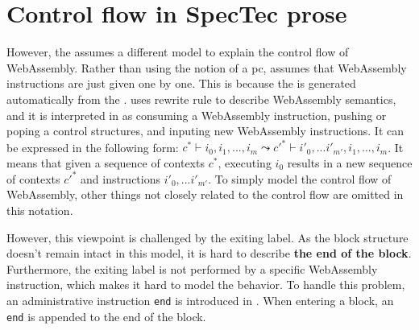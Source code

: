 \section{Control flow in SpecTec prose}

However, the \spectecp{} assumes a different model to explain the control flow
of WebAssembly.
Rather than using the notion of a pc, \spectecp{} assumes that WebAssembly
instructions are just given one by one.
This is because the \spectecp{} is generated automatically from the
.
 uses rewrite rule to describe WebAssembly semantics, and it
is interpreted in \spectecp{} as consuming a WebAssembly instruction, pushing
or poping a control structures, and inputing new WebAssembly instructions.
It can be expressed in the following form:
$c^* \vdash i_0, i_1, ..., i_m \leadsto c'^* \vdash i'_0, ...i'_{m'}, i_1, ..., i_m$.
It means that given a sequence of contexts $c^*$, executing $i_0$ results in a
new sequence of contexts $c'^*$ and instructions $i'_0, ...i'_{m'}$.
To simply model the control flow of WebAssembly, other things not closely
related to the control flow are omitted in this notation.


However, this viewpoint is challenged by the exiting label.
As the block structure doesn't remain intact in this model, it is hard to
describe \textbf{the end of the block}.
Furthermore, the exiting label is not performed by a specific WebAssembly
instruction, which makes it hard to model the behavior.
To handle this problem, an administrative instruction \texttt{end} is
introduced in \spectecp.
When entering a block, an \texttt{end} is appended to the end of the block.



